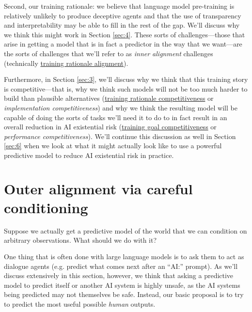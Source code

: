 \documentclass[
  onecolumn,
  nonatbib,
]{miri-tech-article}
\begin{document}
Second, our training rationale: we believe that language model pre-training is relatively unlikely to produce deceptive agents and that the use of transparency and interpretability may be able to fill in the rest of the gap. We'll discuss why we think this might work in Section \ref{sec:4}. These sorts of challenges---those that arise in getting a model that is in fact a predictor in the way that we want---are the sorts of challenges that we'll refer to as \textit{inner alignment} challenges (technically \href{https://www.alignmentforum.org/posts/FDJnZt8Ks2djouQTZ/how-do-we-become-confident-in-the-safety-of-a-machine#Evaluating_proposals_for_building_safe_advanced_AI}{training rationale alignment}\cite{how_become_confident}).

Furthermore, in Section \ref{sec:3}, we'll discuss why we think that this training story is competitive---that is, why we think such models will not be too much harder to build than plausible alternatives (\href{https://www.alignmentforum.org/posts/FDJnZt8Ks2djouQTZ/how-do-we-become-confident-in-the-safety-of-a-machine#Evaluating_proposals_for_building_safe_advanced_AI}{training rationale competitiveness}\cite{how_become_confident} or \textit{implementation competitiveness}) and why we think the resulting model will be capable of doing the sorts of tasks we'll need it to do to in fact result in an overall reduction in AI existential risk (\href{https://www.alignmentforum.org/posts/FDJnZt8Ks2djouQTZ/how-do-we-become-confident-in-the-safety-of-a-machine#Evaluating_proposals_for_building_safe_advanced_AI}{training goal competitiveness}\cite{how_become_confident} or \textit{performance competitiveness}). We'll continue this discussion as well in Section \ref{sec:6} when we look at what it might actually look like to use a powerful predictive model to reduce AI existential risk in practice.


\section{Outer alignment via careful conditioning}
\label{sec:2}

Suppose we actually get a predictive model of the world that we can condition on arbitrary observations. What should we do with it?

One thing that is often done with large language models is to ask them to act as dialogue agents (e.g. predict what comes next after an ``AI:'' prompt). As we'll discuss extensively in this section, however, we think that asking a predictive model to predict itself or another AI system is highly unsafe, as the AI systems being predicted may not themselves be safe. Instead, our basic proposal is to try to predict the most useful possible \textit{human} outputs.
\end{document}
